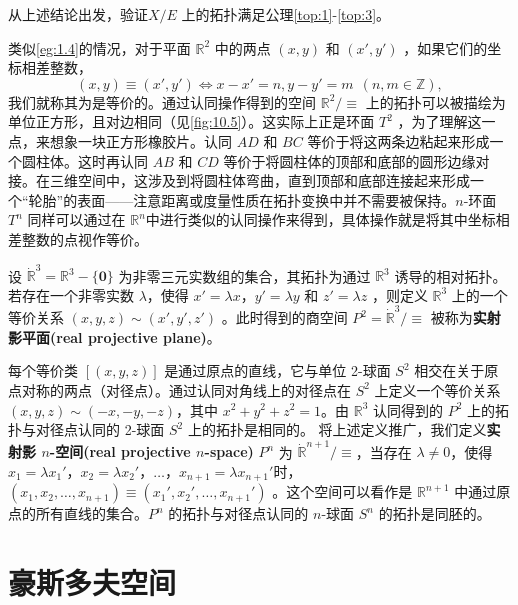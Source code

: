 \begin{exercise}
	从上述结论出发，验证$X/E$ 上的拓扑满足公理\ref{top:1}-\ref{top:3}。
\end{exercise}

\begin{eg}\label{eg:10.14}
	类似\ref{eg:1.4}的情况，对于平面 $\mathbb{R}^{2}$ 中的两点 $(x,y)$ 和 $(x',y')$ ，如果它们的坐标相差整数，
\begin{equation*}
(x,y)\equiv (x',y')\Longleftrightarrow x-x'=n,y-y'=m\ \ (n,m\in \mathbb{Z} ),
\end{equation*}
我们就称其为是等价的。通过认同操作得到的空间 $\mathbb{R}^{2} /\equiv $ 上的拓扑可以被描绘为单位正方形，且对边相同（见\ref{fig:10.5}）。这实际上正是环面 $T^{2}$ ，为了理解这一点，来想象一块正方形橡胶片。认同 $AD$ 和 $BC$ 等价于将这两条边粘起来形成一个圆柱体。这时再认同 $AB$ 和 $CD$ 等价于将圆柱体的顶部和底部的圆形边缘对接。在三维空间中，这涉及到将圆柱体弯曲，直到顶部和底部连接起来形成一个“轮胎”的表面——注意距离或度量性质在拓扑变换中并不需要被保持。$n$-环面 $T^{n}$ 同样可以通过在 $\mathbb{R}^{n}$中进行类似的认同操作来得到，具体操作就是将其中坐标相差整数的点视作等价。
\end{eg}

\begin{eg}\label{eg:10.15}
	设 $\dot{\mathbb{R}}^{3} =\mathbb{R}^{3} -\{\mathbf{0} \}$ 为非零三元实数组的集合，其拓扑为通过 $\mathbb{R}^{3}$ 诱导的相对拓扑。若存在一个非零实数 $\lambda $，使得 $x'=\lambda x$，$y'=\lambda y$ 和 $z'=\lambda z$ ，则定义 $\mathbb{R}^{3}$ 上的一个等价关系 $(x,y,z)\sim (x',y',z')$ 。此时得到的商空间 $P^{2} =\dot{\mathbb{R}}^{3} /\equiv $ 被称为\textbf{实射影平面(real projective plane)}。
\end{eg}
	每个等价类 $[(x,y,z)]$ 是通过原点的直线，它与单位 2-球面 $S^{2}$ 相交在关于原点对称的两点（对径点）。通过认同对角线上的对径点在 $S^{2}$ 上定义一个等价关系$(x,y,z)\sim (-x,-y,-z)$，其中 $x^{2} +y^{2} +z^{2} =1$。由 $\mathbb{R}^{3}$ 认同得到的 $P^{2}$ 上的拓扑与对径点认同的 2-球面 $S^{2}$ 上的拓扑是相同的。
	将上述定义推广，我们定义\textbf{实射影 $n$-空间(real projective $n$-space)} $P^{n}$ 为 $\dot{\mathbb{R}}^{n+1} /\equiv $，当存在 $\lambda \neq 0$，使得 $x_{1} =\lambda x_{1} '$，$x_{2} =\lambda x_{2} '$，$\dotsc $，$x_{n+1} =\lambda x_{n+1} '$时，$(x_{1} ,x_{2} ,\dotsc ,x_{n+1} )\equiv (x_{1} ',x_{2} ',\dotsc ,x_{n+1} ')$ 。这个空间可以看作是 $\mathbb{R}^{n+1}$ 中通过原点的所有直线的集合。$P^{n}$ 的拓扑与对径点认同的 $n$-球面 $S^{n}$ 的拓扑是同胚的。

\section{豪斯多夫空间}


